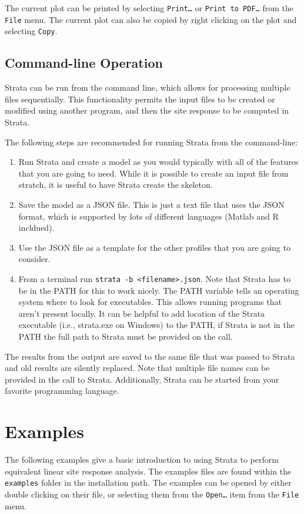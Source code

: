 \documentclass[12pt,oneside]{book}
\begin{document}
The current plot can be printed by selecting \texttt{Print\dots} or \texttt{Print to PDF\dots} from
the \texttt{File} menu.  The current plot can also be copied by right clicking on the plot and
selecting \texttt{Copy}.

\subsection{Command-line Operation}

Strata can be run from the command line, which allows for processing multiple files
sequentially. This functionality permits the input files to be created or modified using another
program, and then the site response to be computed in Strata. 


The following steps are recommended for running Strata from the command-line:

\begin{enumerate}
    \item Run Strata and create a model as you would typically with all of the features that you are
        going to need.  While it is possible to create an input file from stratch, it is useful to
        have Strata create the skeleton.
    \item Save the model as a JSON file. This is just a text file that uses the JSON format, which
        is supported by lots of different languages (Matlab and R incldued).
    \item Use the JSON file as a template for the other profiles that you are going to consider.
    \item From a terminal run \texttt{strata -b <filename>.json}. Note that Strata has to be in the
        PATH for this to work nicely.  The PATH variable tells an operating system where to look for
        executables. This allows running programs that aren't present locally. It can be helpful to
        add location of the Strata executable (i.e., strata.exe on Windows) to the PATH, if Strata
        is not in the PATH the full path to Strata must be provided on the call. 
\end{enumerate}
The results from the output are saved to the same file that was passed to Strata and old results are
silently replaced. Note that multiple file names can be provided in the call to Strata.
Additionally, Strata can be started from your favorite programming language.

\section{Examples}
The following examples give a basic introduction to using Strata to perform equivalent linear site
response analysis.  The examples files are found within the \texttt{examples} folder in the
installation path.  The examples can be opened by either double clicking on their file, or selecting
them from the \texttt{Open\dots} item from the \texttt{File} menu.
\end{document}
